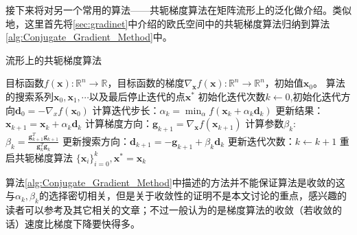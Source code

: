 接下来将对另一个常用的算法——共轭梯度算法在矩阵流形上的泛化做介绍。类似地，这里首先将\ref{sec:gradinet}中介绍的欧氏空间中的共轭梯度算法归纳到算法\ref{alg:Conjugate_Gradient_Method}中。
\begin{algorithm}[htb]
\caption{流形上的共轭梯度算法}
\label{alg:Conjugate_Gradient_Method}
\begin{algorithmic}[1]
\REQUIRE 目标函数$f(\bm{x}):\mathbb{R}^{n}\rightarrow \mathbb{R}$，目标函数的梯度$\nabla_{\bm{x}} f(\bm{x}):\mathbb{R}^{n}\rightarrow \mathbb{R}^{n}$，初始值$\bm{x}_0$。
\ENSURE 算法的搜索系列$\bm{x}_0,\bm{x}_1,\cdots$以及最后停止迭代的点$\bm{x}^{*}$
\STATE 初始化迭代次数$k\leftarrow 0$,初始化迭代方向$\bm{d}_{0}=-\nabla_x f(\bm{x}_0)$
\STATE 计算迭代步长：$\alpha_{k}=\min_{\alpha}f(\bm{x}_{k}+\alpha_{k}\bm{d}_{k})$
\STATE 更新结果：$\bm{x}_{k+1}=\bm{x}_{k}+\alpha_{k}\bm{d}_{k}$
\STATE 计算梯度方向：$\bm{g}_{k+1}=\nabla_{\bm{x}}f(\bm{x}_{k+1})$
\STATE 计算参数$\beta_{k}$: $\beta_{k}=\frac{\bm{g}_{k+1}^{T}\bm{g}_{k+1}}{\bm{g}_{k}^{T}\bm{g}_{k}}$
\STATE 更新搜索方向：$\bm{d}_{k+1}=-\bm{g}_{k+1}+\beta_{k}\bm{d}_{k}$
\STATE 更新迭代次数：$k\leftarrow k+1$
\STATE 重启共轭梯度算法
\ENDIF
\ENDWHILE
\RETURN $\{\bm{x}_i\}_{i=0}^{k},\bm{x}^{*}=\bm{x}_{k}$
\end{algorithmic}
\end{algorithm}

算法\ref{alg:Conjugate_Gradient_Method}中描述的方法并不能保证算法是收敛的这与$\alpha_{k},\beta_{k}$的选择密切相关，但是关于收敛性的证明不是本文讨论的重点，感兴趣的读者可以参考\cite{Maniopt_book}及其它相关的文章；不过一般认为的是梯度算法的收敛（若收敛的话）速度比梯度下降要快得多。

